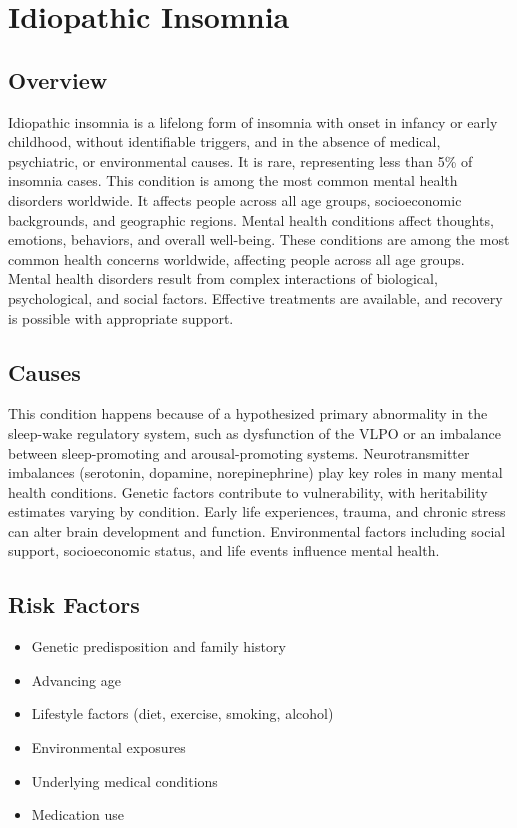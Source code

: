 \chapter{Idiopathic Insomnia}
\label{sec:Idiopathic Insomnia}

\section{Overview}
Idiopathic insomnia is a lifelong form of insomnia with onset in infancy or early childhood, without identifiable triggers, and in the absence of medical, psychiatric, or environmental causes. It is rare, representing less than 5\% of insomnia cases. This condition is among the most common mental health disorders worldwide. It affects people across all age groups, socioeconomic backgrounds, and geographic regions. Mental health conditions affect thoughts, emotions, behaviors, and overall well-being. These conditions are among the most common health concerns worldwide, affecting people across all age groups. Mental health disorders result from complex interactions of biological, psychological, and social factors. Effective treatments are available, and recovery is possible with appropriate support.
\section{Causes}
This condition happens because of a hypothesized primary abnormality in the sleep-wake regulatory system, such as dysfunction of the VLPO or an imbalance between sleep-promoting and arousal-promoting systems.  Neurotransmitter imbalances (serotonin, dopamine, norepinephrine) play key roles in many mental health conditions. Genetic factors contribute to vulnerability, with heritability estimates varying by condition. Early life experiences, trauma, and chronic stress can alter brain development and function. Environmental factors including social support, socioeconomic status, and life events influence mental health.   
\section{Risk Factors}
\begin{itemize}[noitemsep]
  \item Genetic predisposition and family history
  \item Advancing age
  \item Lifestyle factors (diet, exercise, smoking, alcohol)
  \item Environmental exposures
  \item Underlying medical conditions
  \item Medication use
\end{itemize}
